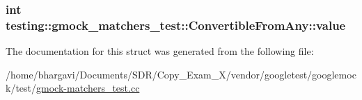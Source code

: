 \subsubsection[{\texorpdfstring{value}{value}}]{\setlength{\rightskip}{0pt plus 5cm}int testing\+::gmock\+\_\+matchers\+\_\+test\+::\+Convertible\+From\+Any\+::value}\hypertarget{structtesting_1_1gmock__matchers__test_1_1_convertible_from_any_a7d18bc7eb4d6eaae32d581e7c204f917}{}\label{structtesting_1_1gmock__matchers__test_1_1_convertible_from_any_a7d18bc7eb4d6eaae32d581e7c204f917}


The documentation for this struct was generated from the following file\+:\begin{DoxyCompactItemize}
\item 
/home/bhargavi/\+Documents/\+S\+D\+R/\+Copy\+\_\+\+Exam\+\_\+X/vendor/googletest/googlemock/test/\hyperlink{gmock-matchers__test_8cc}{gmock-\/matchers\+\_\+test.\+cc}\end{DoxyCompactItemize}
